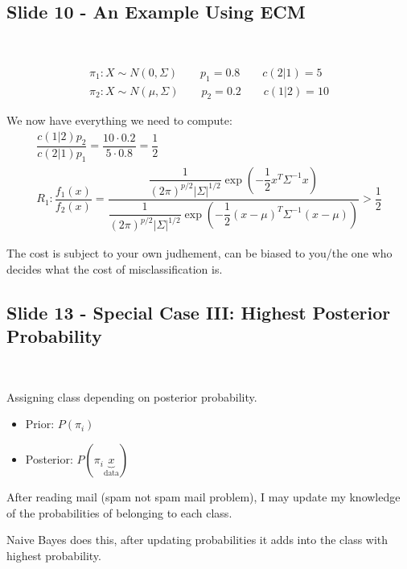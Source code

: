 \subsection{Slide 10 - An Example Using ECM}\hfill\\\par
\begin{equation*}
  \begin{gathered}
    \pi_1: X\sim N(0,\Sigma)\qquad p_1 = 0.8\qquad c(2|1) = 5\\
    \pi_2: X\sim N(\mu,\Sigma)\qquad p_2 = 0.2\qquad c(1|2) = 10
  \end{gathered}
\end{equation*}\par
\noindent We now have everything we need to compute:
\begin{equation*}
  \begin{gathered}
    \dfrac{c(1|2)p_2}{c(2|1)p_1} = \dfrac{10\cdot 0.2}{5\cdot 0.8} = \dfrac{1}{2}\\
    R_1: \dfrac{f_1(x)}{f_2(x)} = \dfrac{\dfrac{1}{(2\pi)^{p/2}\left|\Sigma\right|^{1/2}}\exp{\left(-\dfrac{1}{2}x^T\Sigma^{-1}x\right)}}{\dfrac{1}{(2\pi)^{p/2}\left|\Sigma\right|^{1/2}}\exp{\left(-\dfrac{1}{2}(x-\mu)^T\Sigma^{-1}(x-\mu)\right)}}>\dfrac{1}{2}
  \end{gathered}
\end{equation*}
\par\bigskip
\noindent The cost is subject to your own judhement, can be biased to you/the one who decides what the cost of misclassification is. 
\par\bigskip
\subsection{Slide 13 - Special Case III: Highest Posterior Probability}\hfill\\\par
\noindent Assigning class depending on posterior probability.\par
\begin{itemize}
  \item Prior: $P(\pi_i)$
  \item Posterior: $P(\pi_i\underbrace{x}_{\text{data}})$
\end{itemize}\par
\noindent After reading mail (spam not spam mail problem), I may update my knowledge of the probabilities of belonging to each class.\par
\noindent Naive Bayes does this, after updating probabilities it adds into the class with highest probability.
\par\bigskip
